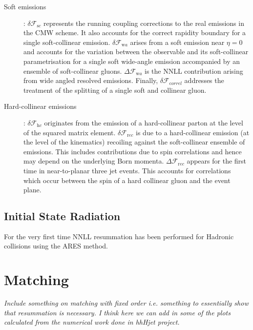 \begin{description}
\item[Soft emissions]: $\delta\mathcal{F}_{\mathrm sc}$ represents the running coupling corrections to the real emissions in the CMW scheme. It also accounts for the correct rapidity boundary for a single soft-collinear emission. $\delta\mathcal{F}_{\mathrm wa}$ arises from a soft emission near $\eta=0$ and accounts for the variation between the observable and its soft-collinear parametrisation for a single soft wide-angle emission accompanied by an ensemble of soft-collinear gluons. $\Delta\mathcal{F}_{\mathrm wa}$ is the NNLL contribution arising from wide angled resolved emissions. Finally, $\delta\mathcal{F}_{\mathrm correl}$ addresses the treatment of the splitting of a single soft and collinear gluon.

\item[Hard-collinear emissions]: $\delta\mathcal{F}_{\mathrm hc}$ originates from the emission of a hard-collinear parton at the level of the squared matrix element. $\delta\mathcal{F}_{\mathrm rec}$ is due to a hard-collinear emission (at the level of the kinematics) recoiling against the soft-collinear ensemble of emissions. This includes contributions due to spin correlations and hence may depend on the underlying Born momenta. $\Delta\mathcal{F}_{\mathrm rec}$ appears for the first time in near-to-planar three jet events. This accounts for correlations which occur between the spin of a hard collinear gluon and the event plane. 
\end{description}
\subsection{Initial State Radiation}
 {\color{purple} For the very first time NNLL resummation has been performed for Hadronic collisions using the ARES method.}








\section{Matching}
\emph{Include something on matching with fixed order i.e. something to essentially show that resummation is necessary. I think here we can add in some of the plots calculated from the numerical work done in hhHjet project.}